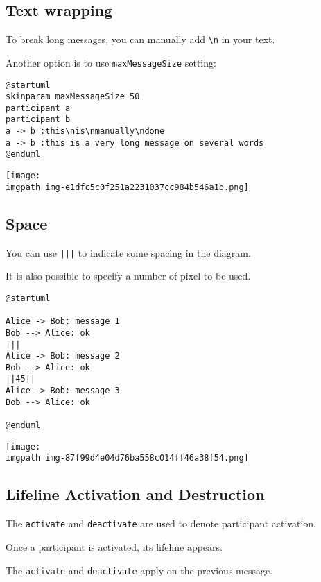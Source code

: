 \subsection{Text wrapping}


To break long messages, you can manually add \texttt{\textbackslash n} in your text.


Another option is to use \texttt{maxMessageSize} setting:


\begin{verbatim}
@startuml
skinparam maxMessageSize 50
participant a
participant b
a -> b :this\nis\nmanually\ndone
a -> b :this is a very long message on several words
@enduml
\end{verbatim}
\begin{center}
\texttt{[image: \\imgpath img-e1dfc5c0f251a2231037cc984b546a1b.png]}
\end{center}
%
%
\subsection{Space}




You can use \texttt{|||} to indicate some spacing in the diagram.


It is also possible to specify a number of pixel to be used.
\begin{verbatim}
@startuml

Alice -> Bob: message 1
Bob --> Alice: ok
|||
Alice -> Bob: message 2
Bob --> Alice: ok
||45||
Alice -> Bob: message 3
Bob --> Alice: ok

@enduml
\end{verbatim}
\begin{center}
\texttt{[image: \\imgpath img-87f99d4e04d76ba558c014ff46a38f54.png]}
\end{center}


%
%
\subsection{Lifeline Activation and Destruction}


The \texttt{activate} and \texttt{deactivate} are used to denote
participant activation.


Once a participant is activated, its lifeline appears.


The \texttt{activate} and \texttt{deactivate} apply on
the previous message.


